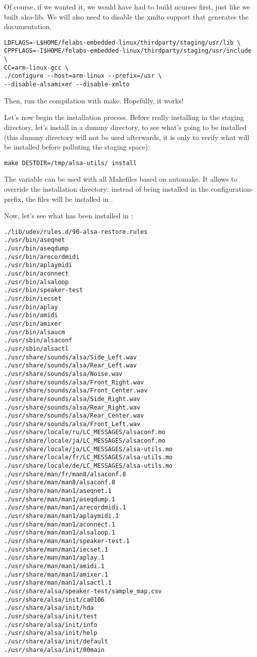 Of course, if we wanted it, we would have had to build ncurses first,
just like we built alsa-lib. We will also need to disable the xmlto
support that generates the documentation.

\begin{verbatim}
LDFLAGS=-L$HOME/felabs-embedded-linux/thirdparty/staging/usr/lib \
CPPFLAGS=-I$HOME/felabs-embedded-linux/thirdparty/staging/usr/include \
CC=arm-linux-gcc \
./configure --host=arm-linux --prefix=/usr \
--disable-alsamixer --disable-xmlto
\end{verbatim}

Then, run the compilation with make. Hopefully, it works!

Let's now begin the installation process.  Before really installing in
the staging directory, let's install in a dummy directory, to see
what's going to be installed (this dummy directory will not be used
afterwards, it is only to verify what will be installed before
polluting the staging space):

\begin{verbatim}
make DESTDIR=/tmp/alsa-utils/ install
\end{verbatim}

The  variable can be used with all Makefiles based on
automake. It allows to override the installation directory: instead of
being installed in the configuration-prefix, the files will be
installed in .

Now, let's see what has been installed in \code{/tmp/alsa-utils/}:

\begin{verbatim}
./lib/udev/rules.d/90-alsa-restore.rules
./usr/bin/aseqnet
./usr/bin/aseqdump
./usr/bin/arecordmidi
./usr/bin/aplaymidi
./usr/bin/aconnect
./usr/bin/alsaloop
./usr/bin/speaker-test
./usr/bin/iecset
./usr/bin/aplay
./usr/bin/amidi
./usr/bin/amixer
./usr/bin/alsaucm
./usr/sbin/alsaconf
./usr/sbin/alsactl
./usr/share/sounds/alsa/Side_Left.wav
./usr/share/sounds/alsa/Rear_Left.wav
./usr/share/sounds/alsa/Noise.wav
./usr/share/sounds/alsa/Front_Right.wav
./usr/share/sounds/alsa/Front_Center.wav
./usr/share/sounds/alsa/Side_Right.wav
./usr/share/sounds/alsa/Rear_Right.wav
./usr/share/sounds/alsa/Rear_Center.wav
./usr/share/sounds/alsa/Front_Left.wav
./usr/share/locale/ru/LC_MESSAGES/alsaconf.mo
./usr/share/locale/ja/LC_MESSAGES/alsaconf.mo
./usr/share/locale/ja/LC_MESSAGES/alsa-utils.mo
./usr/share/locale/fr/LC_MESSAGES/alsa-utils.mo
./usr/share/locale/de/LC_MESSAGES/alsa-utils.mo
./usr/share/man/fr/man8/alsaconf.8
./usr/share/man/man8/alsaconf.8
./usr/share/man/man1/aseqnet.1
./usr/share/man/man1/aseqdump.1
./usr/share/man/man1/arecordmidi.1
./usr/share/man/man1/aplaymidi.1
./usr/share/man/man1/aconnect.1
./usr/share/man/man1/alsaloop.1
./usr/share/man/man1/speaker-test.1
./usr/share/man/man1/iecset.1
./usr/share/man/man1/aplay.1
./usr/share/man/man1/amidi.1
./usr/share/man/man1/amixer.1
./usr/share/man/man1/alsactl.1
./usr/share/alsa/speaker-test/sample_map.csv
./usr/share/alsa/init/ca0106
./usr/share/alsa/init/hda
./usr/share/alsa/init/test
./usr/share/alsa/init/info
./usr/share/alsa/init/help
./usr/share/alsa/init/default
./usr/share/alsa/init/00main
\end{verbatim}

